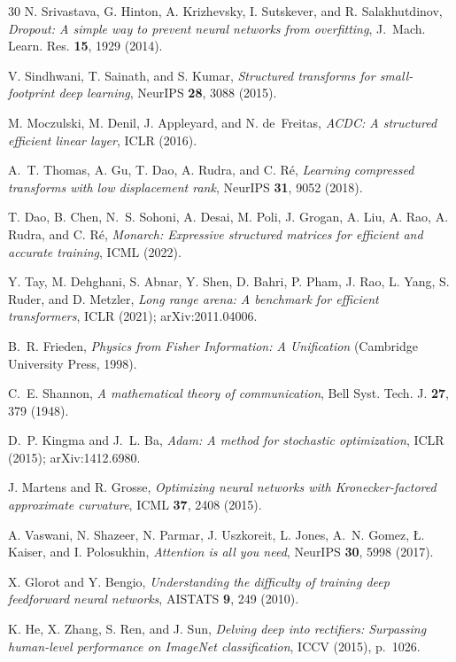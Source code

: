 \documentclass[aps,prx,onecolumn,11pt,nofootinbib,longbibliography]{revtex4-2}
\begin{document}
\begin{thebibliography}{30}
N. Srivastava, G. Hinton, A. Krizhevsky, I. Sutskever, and R. Salakhutdinov,
\textit{Dropout: A simple way to prevent neural networks from overfitting},
J.~Mach. Learn. Res. \textbf{15}, 1929 (2014).

V. Sindhwani, T. Sainath, and S. Kumar, \textit{Structured transforms for
small-footprint deep learning}, NeurIPS \textbf{28}, 3088 (2015).

M. Moczulski, M. Denil, J. Appleyard, and N. de~Freitas, \textit{ACDC:
A structured efficient linear layer}, ICLR (2016).

A.~T. Thomas, A. Gu, T. Dao, A. Rudra, and C. R\'e, \textit{Learning
compressed transforms with low displacement rank}, NeurIPS \textbf{31},
9052 (2018).

T. Dao, B. Chen, N.~S. Sohoni, A. Desai, M. Poli, J. Grogan, A. Liu,
A. Rao, A. Rudra, and C. R\'e, \textit{Monarch: Expressive structured
matrices for efficient and accurate training}, ICML (2022).

Y. Tay, M. Dehghani, S. Abnar, Y. Shen, D. Bahri, P. Pham, J. Rao,
L. Yang, S. Ruder, and D. Metzler, \textit{Long range arena: A benchmark
for efficient transformers}, ICLR (2021); arXiv:2011.04006.

B.~R. Frieden, \textit{Physics from Fisher Information: A Unification}
(Cambridge University Press, 1998).

C.~E. Shannon, \textit{A mathematical theory of communication},
Bell Syst. Tech. J. \textbf{27}, 379 (1948).

D.~P. Kingma and J.~L. Ba, \textit{Adam: A method for stochastic
optimization}, ICLR (2015); arXiv:1412.6980.

J. Martens and R. Grosse, \textit{Optimizing neural networks with
Kronecker-factored approximate curvature}, ICML \textbf{37}, 2408 (2015).

A. Vaswani, N. Shazeer, N. Parmar, J. Uszkoreit, L. Jones, A.~N. Gomez,
\L. Kaiser, and I. Polosukhin, \textit{Attention is all you need},
NeurIPS \textbf{30}, 5998 (2017).

X. Glorot and Y. Bengio, \textit{Understanding the difficulty of training
deep feedforward neural networks}, AISTATS \textbf{9}, 249 (2010).

K. He, X. Zhang, S. Ren, and J. Sun, \textit{Delving deep into rectifiers:
Surpassing human-level performance on ImageNet classification},
ICCV (2015), p.~1026.


\end{thebibliography}
\end{document}
